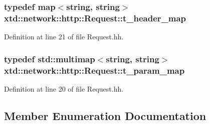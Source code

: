 \subsubsection[{\texorpdfstring{t\+\_\+header\+\_\+map}{t_header_map}}]{\setlength{\rightskip}{0pt plus 5cm}typedef map$<$string, string$>$ {\bf xtd\+::network\+::http\+::\+Request\+::t\+\_\+header\+\_\+map}}\hypertarget{classxtd_1_1network_1_1http_1_1Request_aeaf2a69c884e81983aebaf36518c310e}{}\label{classxtd_1_1network_1_1http_1_1Request_aeaf2a69c884e81983aebaf36518c310e}


Definition at line 21 of file Request.\+hh.

\subsubsection[{\texorpdfstring{t\+\_\+param\+\_\+map}{t_param_map}}]{\setlength{\rightskip}{0pt plus 5cm}typedef std\+::multimap$<$string, string$>$ {\bf xtd\+::network\+::http\+::\+Request\+::t\+\_\+param\+\_\+map}}\hypertarget{classxtd_1_1network_1_1http_1_1Request_a3cd6e9ac7c35897002582c4a3b84b17d}{}\label{classxtd_1_1network_1_1http_1_1Request_a3cd6e9ac7c35897002582c4a3b84b17d}


Definition at line 20 of file Request.\+hh.



\subsection{Member Enumeration Documentation}
